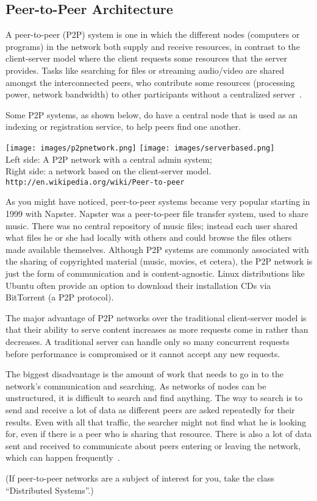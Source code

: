 \subsection*{Peer-to-Peer Architecture}
A peer-to-peer (P2P) system is one in which the different nodes (computers or programs) in the network both supply and receive resources, in contrast to the client-server model where the client requests some resources that the server provides. Tasks like searching for files or streaming audio/video are shared amongst the interconnected peers, who contribute some resources (processing power, network bandwidth) to other participants without a centralized server~\cite{p2p}.

Some P2P systems, as shown below, do have a central node that is used as an indexing or registration service, to help peers find one another.

\begin{center}
\texttt{[image: images/p2pnetwork.png]}
\texttt{[image: images/serverbased.png]}\\
Left side: A P2P network with a central admin system;\\
Right side: a network based on the client-server model.\\
\texttt{http://en.wikipedia.org/wiki/Peer-to-peer}
\end{center}

As you might have noticed, peer-to-peer systems became very popular starting in 1999 with Napster. Napster was a peer-to-peer file transfer system, used to share music. There was no central repository of music files; instead each user shared what files he or she had locally with others and could browse the files others made available themselves. Although P2P systems are commonly associated with the sharing of copyrighted material (music, movies, et cetera), the P2P network is just the form of communication and is content-agnostic. Linux distributions like Ubuntu often provide an option to download their installation CDs via BitTorrent (a P2P protocol).

The major advantage of P2P networks over the traditional client-server model is that their ability to serve content increases as more requests come in rather than decreases. A traditional server can handle only so many concurrent requests before performance is compromised or it cannot accept any new requests. 

The biggest disadvantage is the amount of work that needs to go in to the network's communication and searching. As networks of nodes can be unstructured, it is difficult to search and find anything. The way to search is to send and receive a lot of data as different peers are asked repeatedly for their results. Even with all that traffic, the searcher might not find what he is looking for, even if there is a peer who is sharing that resource. There is also a lot of data sent and received to communicate about peers entering or leaving the network, which can happen frequently~\cite{p2p2}.

(If peer-to-peer networks are a subject of interest for you, take the class ``Distributed Systems''.)



